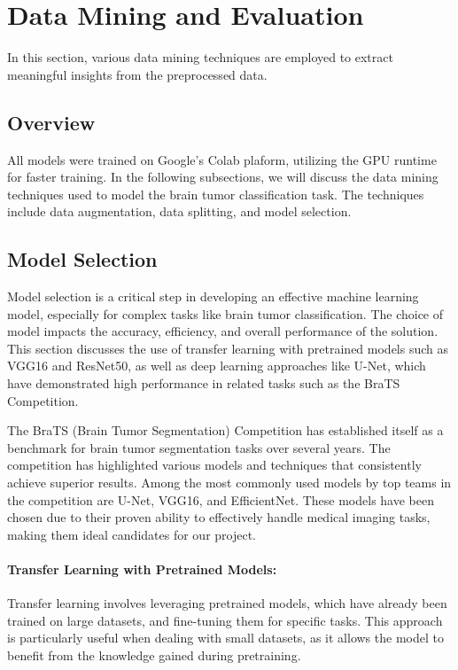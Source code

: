 \section{Data Mining and Evaluation}\label{data_mining}

In this section, various data mining techniques are employed to extract meaningful insights from the preprocessed data.

\subsection{Overview}\label{overview}

All models were trained on Google's Colab plaform, utilizing the GPU runtime for faster training. In the following subsections, we will discuss the data mining techniques used to model the brain tumor classification task. The techniques include data augmentation, data splitting, and model selection.

\subsection{Model Selection}\label{model_selection}

Model selection is a critical step in developing an effective machine learning model, especially for complex tasks like brain tumor classification. The choice of model impacts the accuracy, efficiency, and overall performance of the solution. This section discusses the use of transfer learning with pretrained models such as VGG16 and ResNet50, as well as deep learning approaches like U-Net, which have demonstrated high performance in related tasks such as the BraTS Competition.

The BraTS (Brain Tumor Segmentation) Competition has established itself as a benchmark for brain tumor segmentation tasks over several years. The competition has highlighted various models and techniques that consistently achieve superior results. Among the most commonly used models by top teams in the competition are U-Net, VGG16, and EfficientNet. These models have been chosen due to their proven ability to effectively handle medical imaging tasks, making them ideal candidates for our project.

\paragraph{Transfer Learning with Pretrained Models:}
Transfer learning involves leveraging pretrained models, which have already been trained on large datasets, and fine-tuning them for specific tasks. This approach is particularly useful when dealing with small datasets, as it allows the model to benefit from the knowledge gained during pretraining. 

